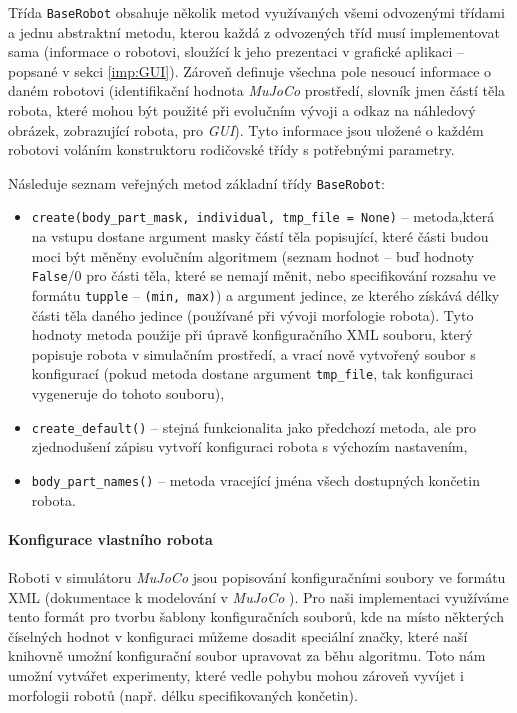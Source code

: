 Třída \texttt{BaseRobot} obsahuje několik metod využívaných všemi odvozenými
třídami a jednu abstraktní metodu, kterou každá z odvozených tříd musí
implementovat sama (informace o robotovi, sloužící k jeho prezentaci v grafické
aplikaci -- popsané v sekci \ref{imp:GUI}). Zároveň definuje všechna pole
nesoucí informace o daném robotovi (identifikační hodnota \emph{MuJoCo}
prostředí, slovník jmen částí těla robota, které mohou být použité při
evolučním vývoji a odkaz na náhledový obrázek, zobrazující robota, pro
\emph{GUI}). Tyto informace jsou uložené o každém robotovi voláním
konstruktoru rodičovské třídy s potřebnými parametry.

Následuje seznam veřejných metod základní třídy
\texttt{BaseRobot}:

\begin{itemize}
    \item \texttt{create(body\_part\_mask, individual, tmp\_file = None)}
        -- metoda,\linebreak která na vstupu dostane argument masky částí těla
        popisující, které části budou moci být měněny evolučním algoritmem
        (seznam hodnot -- buď hodnoty \texttt{False}/0 pro části těla, které se
        nemají měnit, nebo specifikování rozsahu ve formátu \texttt{tupple} --
        \texttt{(min, max)}) a argument jedince, ze kterého získává délky části
        těla daného jedince (používané při vývoji morfologie robota). Tyto
        hodnoty metoda použije při úpravě konfiguračního XML souboru, který
        popisuje robota v simulačním prostředí, a vrací nově vytvořený soubor s
        konfigurací (pokud metoda dostane argument \texttt{tmp\_file}, tak
        konfiguraci vygeneruje do tohoto souboru),
    \item \texttt{create\_default()} -- stejná funkcionalita jako předchozí
        metoda, ale pro zjednodušení zápisu vytvoří konfiguraci robota s
        výchozím nastavením,
    \item \texttt{body\_part\_names()} -- metoda vracející jména všech
        dostupných končetin robota.
\end{itemize}

\paragraph{Konfigurace vlastního robota} \label{imp:robots:symbols}
Roboti v simulátoru \emph{MuJoCo} jsou popisování konfiguračními soubory ve
formátu XML (dokumentace k modelování v \emph{MuJoCo}
\citep{modeling-mujocodocumentation}). Pro naši implementaci využíváme tento
formát pro tvorbu šablony konfiguračních souborů, kde na místo některých
číselných hodnot v konfiguraci můžeme dosadit speciální značky, které naší
knihovně umožní konfigurační soubor upravovat za běhu algoritmu. Toto nám
umožní vytvářet experimenty, které vedle pohybu mohou zároveň vyvíjet i
morfologii robotů (např. délku specifikovaných končetin). 

